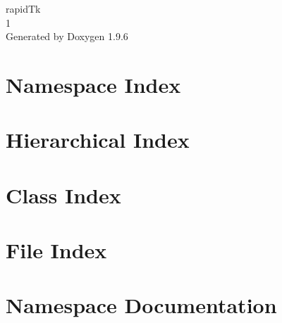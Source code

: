 \documentclass[twoside]{book}
\newcommand{\+}{\discretionary{\mbox{\scriptsize$\hookleftarrow$}}{}{}}
\newcommand{\clearemptydoublepage}{%
    \newpage{\pagestyle{empty}\cleardoublepage}%
  }
\begin{document}
  \raggedbottom
    \hypersetup{pageanchor=false,
                bookmarksnumbered=true,
                pdfencoding=unicode
               }
  \begin{titlepage}
  \vspace*{7cm}
  \begin{center}%
  {\Large rapid\+Tk}\\
  [1ex]\large 1 \\
  \vspace*{1cm}
  {\large Generated by Doxygen 1.9.6}\\
  \end{center}
  \end{titlepage}
  \clearemptydoublepage
  \tableofcontents
  \clearemptydoublepage
  \hypersetup{pageanchor=true}
\chapter{Namespace Index}

\chapter{Hierarchical Index}

\chapter{Class Index}

\chapter{File Index}

\chapter{Namespace Documentation}

























\end{document}
